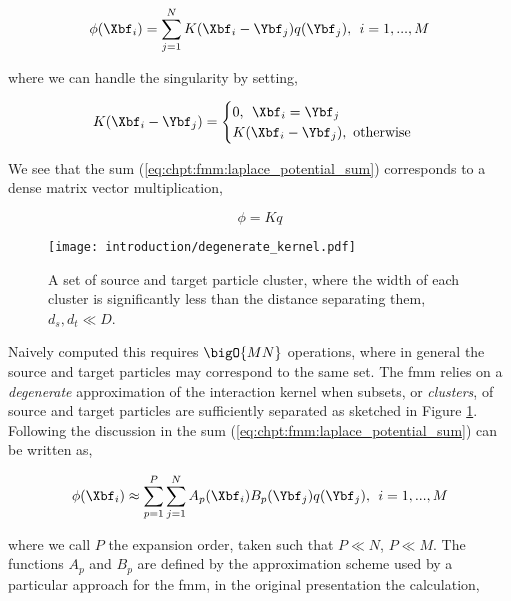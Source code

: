 \begin{equation}
    \phi(\Xbf_i) = \sum_{j=1}^N K(\Xbf_i-\Ybf_j)q(\Ybf_j), \> \> i = 1,...,M
    \label{eq:chpt:fmm:laplace_potential_sum}
\end{equation}

where we can handle the singularity by setting,

\begin{equation}
    K(\Xbf_i - \Ybf_j) = \begin{cases}
        0, \> \> \Xbf_i = \Ybf_j \\
        K(\Xbf_i - \Ybf_j), \text{  otherwise}
    \end{cases}
\end{equation}


We see that the sum (\ref{eq:chpt:fmm:laplace_potential_sum}) corresponds to a dense matrix vector multiplication,

\begin{equation}
    \phi = K q
\end{equation}


\begin{figure}
    \centering
    \texttt{[image: introduction/degenerate\_kernel.pdf]}
    \caption{A set of source and target particle cluster, where the width of each cluster is significantly less than the distance separating them, $d_s, d_t \ll D$.}
    \label{fig:chpt:fmm:degenerate_kernel}
\end{figure}

Naively computed this requires $\bigO{MN}$ operations, where in general the source and target particles may correspond to the same set. The \acrshort{fmm} relies on a \textit{degenerate} approximation of the interaction kernel when subsets, or \textit{clusters}, of source and target particles are sufficiently separated as sketched in Figure \ref{fig:chpt:fmm:degenerate_kernel}. Following the discussion in \cite{kailasa2024m2ltranslationoperatorskernel} the sum (\ref{eq:chpt:fmm:laplace_potential_sum}) can be written as,

\begin{equation}
    \phi(\Xbf_i) \approx \sum_{p=1}^P \sum_{j=1}^N A_p(\Xbf_i) B_p(\Ybf_j)q(\Ybf_j), \> \> i = 1,...,M
    \label{eq:chpt:introduction:sec:motivation:degenerate_kernel}
\end{equation}

where we call $P$ the expansion order, taken such that $P \ll N$, $P \ll M$. The functions $A_p$ and $B_p$ are defined by the approximation scheme used by a particular approach for the \acrshort{fmm}, in the original presentation the calculation,

